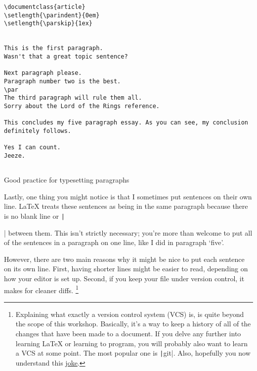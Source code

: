 \begin{listing}[htbp]
	\centering
	\begin{verbatim}
\documentclass{article}
\setlength{\parindent}{0em}
\setlength{\parskip}{1ex}


This is the first paragraph.
Wasn't that a great topic sentence?

Next paragraph please.
Paragraph number two is the best.
\par
The third paragraph will rule them all.
Sorry about the Lord of the Rings reference.

This concludes my five paragraph essay. As you can see, my conclusion definitely follows.

Yes I can count.
Jeeze.


	\end{verbatim}
	\caption{Good practice for typesetting paragraphs}
	\label{lst:good-practice-for-paragraphs}
\end{listing}

Lastly, one thing you might notice is that I sometimes put sentences on their own line.
\LaTeX{} treats these sentences as being in the same paragraph because there is no blank line or \texttt|\par| between them.
This isn't strictly necessary; you're more than welcome to put all of the sentences in a paragraph on one line, like I did in paragraph `five'.

However, there are two main reasons why it might be nice to put each sentence on its own line.
First, having shorter lines might be easier to read, depending on how your editor is set up.
Second, if you keep your  file under version control, it makes for cleaner diffs.%
\footnote{%
Explaining what exactly a version control system (VCS) is, is quite beyond the scope of this workshop.
Basically, it's a way to keep a history of all of the changes that have been made to a document.
If you delve any further into learning \LaTeX{} or learning to program, you will probably also want to learn a VCS at some point.
The most popular one is \texttt|git|.
Also, hopefully you now understand this \href{https://xkcd.com/1285/}{joke}.%
}